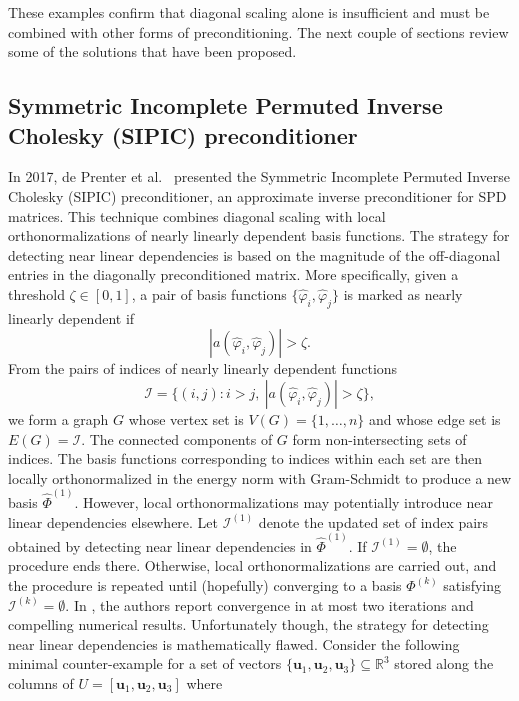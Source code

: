 \documentclass{article}
\numberwithin{equation}{section}
\theoremstyle{definition}
\begin{document}
These examples confirm that diagonal scaling alone is insufficient and must be combined with other forms of preconditioning. The next couple of sections review some of the solutions that have been proposed.

\subsection{Symmetric Incomplete Permuted Inverse Cholesky (SIPIC) preconditioner}
\label{se: sipic}
In 2017, de Prenter et al.\ \cite{de2017condition} presented the Symmetric Incomplete Permuted Inverse Cholesky (SIPIC) preconditioner, an approximate inverse preconditioner for SPD matrices. This technique combines diagonal scaling with local orthonormalizations of nearly linearly dependent basis functions. The strategy for detecting near linear dependencies is based on the magnitude of the off-diagonal entries in the diagonally preconditioned matrix. More specifically, given a threshold $\zeta \in [0,1]$, a pair of basis functions $\{\hat{\varphi}_i,\hat{\varphi}_j\}$ is marked as nearly linearly dependent if
\begin{equation*}
    |a(\hat{\varphi}_i,\hat{\varphi}_j)| > \zeta.
\end{equation*}
From the pairs of indices of nearly linearly dependent functions
\begin{equation*}
    \mathcal{I}=\{(i,j) \colon i>j, \ |a(\hat{\varphi}_i,\hat{\varphi}_j)| > \zeta\},
\end{equation*}
we form a graph $G$ whose vertex set is $V(G)=\{1,\dots,n\}$ and whose edge set is $E(G)=\mathcal{I}$. The connected components of $G$ form non-intersecting sets of indices. The basis functions corresponding to indices within each set are then locally orthonormalized in the energy norm with Gram-Schmidt \cite{golub2013matrix} to produce a new basis $\hat{\Phi}^{(1)}$. However, local orthonormalizations may potentially introduce near linear dependencies elsewhere. Let $\mathcal{I}^{(1)}$ denote the updated set of index pairs obtained by detecting near linear dependencies in $\hat{\Phi}^{(1)}$. If $\mathcal{I}^{(1)} = \emptyset$, the procedure ends there. Otherwise, local orthonormalizations are carried out, and the procedure is repeated until (hopefully) converging to a basis $\Phi^{(k)}$ satisfying $\mathcal{I}^{(k)} = \emptyset$. In \cite{de2017condition}, the authors report convergence in at most two iterations and compelling numerical results. Unfortunately though, the strategy for detecting near linear dependencies is mathematically flawed. Consider the following minimal counter-example for a set of vectors $\{\bm{u}_1,\bm{u}_2,\bm{u}_3\} \subseteq \mathbb{R}^3$ stored along the columns of $U=[\bm{u}_1,\bm{u}_2,\bm{u}_3]$ where
\end{document}
